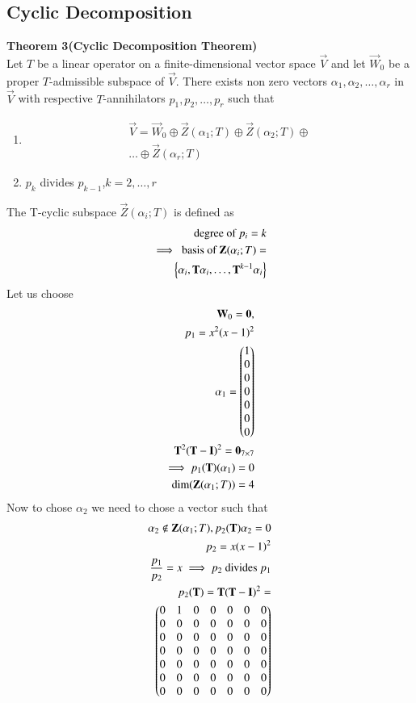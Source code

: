 \documentclass[journal,12pt,twocolumn]{IEEEtran}
\begin{document}
\subsection{Cyclic Decomposition}
\textbf{Theorem 3(Cyclic Decomposition Theorem)}\\
Let $T$ be a linear operator on a finite-dimensional vector space $\vec{V}$ and let $\vec{W}_0$ be a proper $T$-admissible subspace of $\vec{V}.$ There exists non zero vectors $\alpha_1,\alpha_2,\hdots,\alpha_r$ in $\vec{V}$ with respective $T$-annihilators $p_1,p_2,\hdots,p_r$ such that 
\begin{enumerate}
    \item 
    \begin{align}
        \vec{V}=\vec{W}_0\oplus \vec{Z}(\alpha_1;T)\oplus \vec{Z}(\alpha_2;T)\oplus\\\hdots\oplus \vec{Z}(\alpha_r;T)
    \end{align}
    \item $p_k$ divides $p_{k-1}$,$k=2, \hdots,r$
\end{enumerate}
The T-cyclic subspace $ \vec{Z}(\alpha_i;T)$ is defined as 
\begin{align}
   \text{degree of }p_i=k\\
  \implies  \text{ basis of }\mathbf{Z}(\alpha_i;T)=\\\left\{\alpha_i,\mathbf{T}\alpha_i,\hdots,\mathbf{T}^{k-1}\alpha_i\right\}
\end{align}
Let us choose
\begin{align}
 \mathbf{W}_0=\mathbf{0} ,\\
 p_1=x^2(x-1)^2\\
 \alpha_1=\begin{pmatrix}1\\0\\0\\0\\0\\0\\0\end{pmatrix}\\
 \mathbf{T}^2(\mathbf{T}-\mathbf{I})^2=\mathbf{0}_{7 \times 7}\\
 \implies p_1(\mathbf{T})(\alpha_1)=0\\
 \text{dim}(\mathbf{Z}(\alpha_1;T))=4
 \end{align}
 Now to chose $\alpha_2$ we need to chose a vector such that
 \begin{align}
 \alpha_2 \notin \mathbf{Z}(\alpha_1;T),p_2(\mathbf{T})\alpha_2=0\label{3}\\
 p_2=x(x-1)^2\\
  \frac{p_1}{p_2}=x \implies p_2 \text{ divides }p_1 \\
  p_2(\mathbf{T})=\mathbf{T}(\mathbf{T}-\mathbf{I})^2=\\\begin{pmatrix}0&1&0&0&0&0&0\\0&0&0&0&0&0&0\\0&0&0&0&0&0&0\\0&0&0&0&0&0&0\\0&0&0&0&0&0&0\\0&0&0&0&0&0&0\\0&0&0&0&0&0&0\end{pmatrix}
  \end{align}
\end{document}
